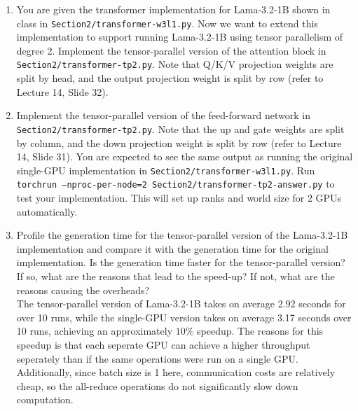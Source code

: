 \documentclass[12pt]{article}
\begin{document}
\begin{enumerate}[label=\textbf{Q\arabic*.}]
\begin{enumerate}
\begin{verbatim}
Legend:

  X    = Self
  SYS  = Connection traversing PCIe as well as the SMP interconnect between NUMA nodes (e.g., QPI/UPI)
  NODE = Connection traversing PCIe as well as the interconnect between PCIe Host Bridges within a NUMA node
  PHB  = Connection traversing PCIe as well as a PCIe Host Bridge (typically the CPU)
  PXB  = Connection traversing multiple PCIe bridges (without traversing the PCIe Host Bridge)
  PIX  = Connection traversing at most a single PCIe bridge
  NV#  = Connection traversing a bonded set of # NVLinks

NIC Legend:

  NIC0: mlx5_0
\end{verbatim}

        \item You are given the transformer implementation for Lama-3.2-1B shown in class in \texttt{Section2/transformer-w3l1.py}. Now we want to extend this implementation to support running Lama-3.2-1B using tensor parallelism of degree 2. Implement the tensor-parallel version of the attention block in \texttt{Section2/transformer-tp2.py}. Note that Q/K/V projection weights are split by head, and the output projection weight is split by row (refer to Lecture 14, Slide 32). \\


        \item Implement the tensor-parallel version of the feed-forward network in \texttt{Section2/tr\allowbreak ansformer-tp2.py}. Note that the up and gate weights are split by column, and the down projection weight is split by row (refer to Lecture 14, Slide 31). You are expected to see the same output as running the original single-GPU implementation in \texttt{Section2/transformer-w3l1.py}. Run \texttt{torchrun --nproc-per-node=2 Section2/transformer-tp2-answer.py} to test your implementation. This will set up ranks and world size for 2 GPUs automatically. \\

        \item Profile the generation time for the tensor-parallel version of the Lama-3.2-1B implementation and compare it with the generation time for the original implementation. Is the generation time faster for the tensor-parallel version? If so, what are the reasons that lead to the speed-up? If not, what are the reasons causing the overheads? \\

        The tensor-parallel version of Lama-3.2-1B takes on average 2.92 seconds for over 10 runs, while the single-GPU version takes on average 3.17 seconds over 10 runs, achieving an approximately $10\%$ speedup. The reasons for this speedup is that each seperate GPU can achieve a higher throughput seperately than if the same operations were run on a single GPU. Additionally, since batch size is 1 here, communication costs are relatively cheap, so the all-reduce operations do not significantly slow down computation.
    

\end{enumerate}
\end{enumerate}
\end{document}
